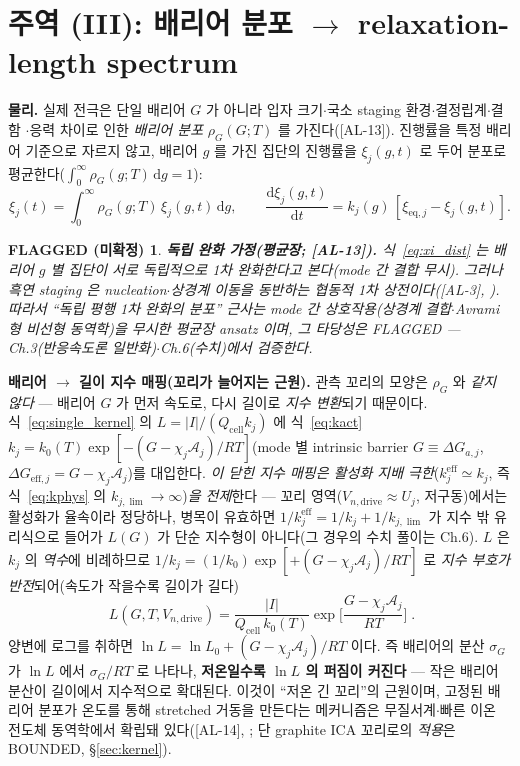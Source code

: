\documentclass[11pt,a4paper]{article}
\newtheorem*{flagbox}{FLAGGED (미확정)}
\newcommand{\dd}{\mathrm{d}}
\newcommand{\eff}{\mathrm{eff}}
\newcommand{\eq}{\mathrm{eq}}
\newcommand{\drive}{\mathrm{drive}}
\newcommand{\cell}{\mathrm{cell}}
\newcommand{\AL}[1]{\textsf{[AL-#1]}}
\begin{document}
\section{주역 (III): 배리어 분포 $\to$ relaxation-length spectrum}\label{sec:spectrum}
\textbf{물리.} 실제 전극은 단일 배리어 $G$ 가 아니라 입자 크기$\cdot$국소 staging 환경$\cdot$결정립계$\cdot$결함
$\cdot$응력 차이로 인한 \emph{배리어 분포} $\rho_G(G;T)$ 를 가진다(\AL{13}). 진행률을 특정 배리어 기준으로
자르지 않고, 배리어 $g$ 를 가진 집단의 진행률을 $\xi_j(g,t)$ 로 두어 분포로 평균한다($\int_0^\infty
\rho_G(g;T)\,\dd g=1$):
\begin{equation}
\xi_j(t)=\int_0^\infty \rho_G(g;T)\,\xi_j(g,t)\,\dd g,\qquad
\frac{\dd\xi_j(g,t)}{\dd t}=k_j(g)\,[\xi_{\eq,j}-\xi_j(g,t)].
\label{eq:xi_dist}
\end{equation}
\begin{flagbox}
\textbf{독립 완화 가정(평균장; \AL{13}).} 식~\eqref{eq:xi_dist} 는 배리어 $g$ 별 집단이 \emph{서로 독립적으로}
1차 완화한다고 본다(mode 간 결합 무시). 그러나 흑연 staging 은 nucleation$\cdot$상경계 이동을 동반하는
\emph{협동적 1차 상전이}다(\AL{3}, \cite{funabiki1999ea,funabiki1999jes}). 따라서 ``독립 평행 1차 완화의 분포''
근사는 mode 간 상호작용(상경계 결합$\cdot$Avrami 형 비선형 동역학)을 무시한 \emph{평균장 ansatz} 이며, 그 타당성은
FLAGGED — Ch.3(반응속도론 일반화)$\cdot$Ch.6(수치)에서 검증한다.
\end{flagbox}

\textbf{배리어 $\to$ 길이 지수 매핑(꼬리가 늘어지는 근원).} 관측 꼬리의 모양은 $\rho_G$ 와 \emph{같지 않다}
— 배리어 $G$ 가 먼저 속도로, 다시 길이로 \emph{지수 변환}되기 때문이다. 식~\eqref{eq:single_kernel} 의
$L=|I|/(Q_\cell k_j)$ 에 식~\eqref{eq:kact} $k_j=k_0(T)\exp[-(G-\chi_j\mathcal A_j)/RT]$(mode 별 intrinsic
barrier $G\equiv\Delta G_{a,j}$, $\Delta G_{\eff,j}=G-\chi_j\mathcal A_j$)를 대입한다. \emph{이 닫힌 지수 매핑은
활성화 지배 극한}($k_j^{\eff}\simeq k_j$, 즉 식~\eqref{eq:kphys} 의 $k_{j,\lim}\to\infty$)\emph{을 전제}한다 — 꼬리
영역($V_{n,\drive}\approx U_j$, 저구동)에서는 활성화가 율속이라 정당하나, 병목이 유효하면
$1/k_j^{\eff}=1/k_j+1/k_{j,\lim}$ 가 지수 밖 유리식으로 들어가 $L(G)$ 가 단순 지수형이 아니다(그 경우의 수치 풀이는
Ch.6). $L$ 은 $k_j$ 의 \emph{역수}에 비례하므로 $1/k_j=(1/k_0)\exp[+(G-\chi_j\mathcal A_j)/RT]$ 로
\emph{지수 부호가 반전}되어(속도가 작을수록 길이가 길다)
\begin{equation}
\boxed{\;L(G,T,V_{n,\drive})=\frac{|I|}{Q_\cell\,k_0(T)}\exp\!\Big[\frac{G-\chi_j\mathcal A_j}{RT}\Big]\;.}
\label{eq:L_of_G}
\end{equation}
양변에 로그를 취하면 $\ln L=\ln L_0+(G-\chi_j\mathcal A_j)/RT$ 이다. 즉 배리어의 분산 $\sigma_G$ 가 $\ln L$
에서 $\sigma_G/RT$ 로 나타나, \textbf{저온일수록 $\ln L$ 의 퍼짐이 커진다} — 작은 배리어 분산이 길이에서
지수적으로 확대된다. 이것이 ``저온 긴 꼬리''의 근원이며, 고정된 배리어 분포가 온도를 통해 stretched 거동을
만든다는 메커니즘은 무질서계$\cdot$빠른 이온 전도체 동역학에서 확립돼 있다(\AL{14},
\cite{svare2000,johnston2006,lindsey1980}; 단 graphite ICA 꼬리로의 \emph{적용}은 BOUNDED, \S\ref{sec:kernel}).
\end{document}
